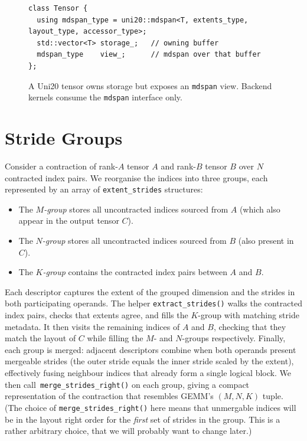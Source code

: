 \documentclass[11pt]{article}
\begin{document}
\begin{figure}[h]
  \centering
  \begin{minipage}{0.9\linewidth}
    \begin{lstlisting}
class Tensor {
  using mdspan_type = uni20::mdspan<T, extents_type, layout_type, accessor_type>;
  std::vector<T> storage_;   // owning buffer
  mdspan_type    view_;      // mdspan over that buffer
};
    \end{lstlisting}
  \end{minipage}
  \caption{A Uni20 tensor owns storage but exposes an \texttt{mdspan} view.  Backend kernels consume
  the \texttt{mdspan} interface only.}
  \label{fig:tensor-mdspan}
\end{figure}

\section{Stride Groups}
Consider a contraction of rank-$A$ tensor $A$ and rank-$B$ tensor $B$ over $N$ contracted index
pairs.  We reorganise the indices into three groups, each represented by an array of
\texttt{extent\_strides} structures:
\begin{itemize}
  \item The \emph{$M$-group} stores all uncontracted indices sourced from $A$ (which also appear in
        the output tensor $C$).
  \item The \emph{$N$-group} stores all uncontracted indices sourced from $B$ (also present in $C$).
  \item The \emph{$K$-group} contains the contracted index pairs between $A$ and $B$.
\end{itemize}
Each descriptor captures the extent of the grouped dimension and the strides in both participating
operands.  The helper \texttt{extract\_strides()} walks the contracted index pairs, checks that
extents agree, and fills the $K$-group with matching stride metadata.  It then visits the remaining
indices of $A$ and $B$, checking that they match the layout of $C$ while filling the $M$- and
$N$-groups respectively.  Finally, each group is merged: adjacent descriptors combine when both
operands present mergeable strides (the outer stride equals the inner stride scaled by the extent),
effectively fusing neighbour indices that already form a single logical block.  We then call\
\texttt{merge\_strides\_right()} on each group, giving a compact representation of the
contraction that resembles GEMM's $(M,N,K)$ tuple. (The choice of \texttt{merge\_strides\_right()} here
means that unmergable indices will be in the layout right order for the \emph{first} set of strides in the group.
This is a rather arbitrary choice, that we will probably want to change later.)
\end{document}
